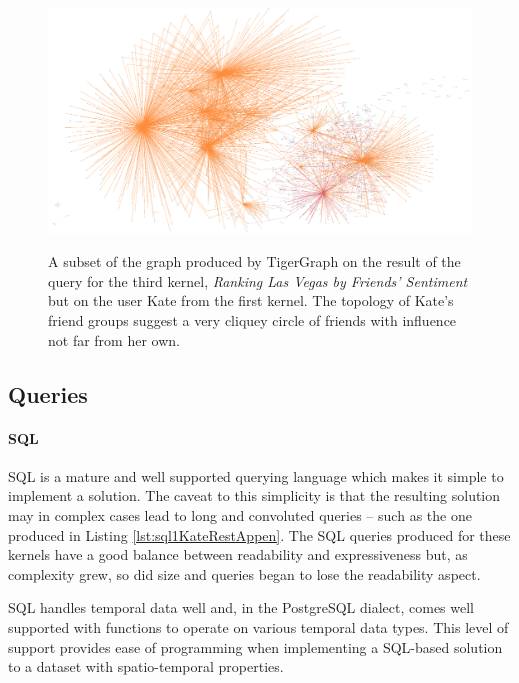 \begin{figure}[h]
    \centering
    \begin{mdframed}[backgroundcolor=gray!70!white, style=GraphFrame]
    {\includegraphics[width=\textwidth]{img/cityAnalysisGraphs/kate-businesses.png}}
    \end{mdframed}
    \caption{A subset of the graph produced by TigerGraph on the result of the query for the third kernel, \emph{Ranking Las Vegas by Friends’ Sentiment} but on the user Kate from the first kernel. The topology of Kate's friend groups suggest a very cliquey circle of friends with influence not far from her own.}
    \label{fig:cityGraphKate}
\end{figure}


\subsection{Queries}

\paragraph{SQL}

SQL is a mature and well supported querying language which makes it simple to implement a solution. The caveat to this simplicity is that the resulting solution may in complex cases lead to long and convoluted queries -- such as the one produced in Listing \ref{lst:sql1KateRestAppen}. The SQL queries produced for these kernels have a good balance between readability and expressiveness but, as complexity grew, so did size and queries began to lose the readability aspect.

SQL handles temporal data well and, in the PostgreSQL dialect, comes well supported with functions to operate on various temporal data types. This level of support provides ease of programming when implementing a SQL-based solution to a dataset with spatio-temporal properties.

